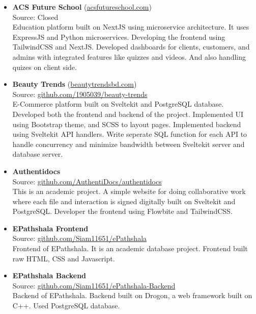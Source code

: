 
\begin{itemize}
  \item {
    \textbf{ACS Future School} (\href{https://www.acsfutureschool.com}{acsfutureschool.com}) \\
    Source: Closed \\
    Education platform built on NextJS using microservice architecture. It uses ExpressJS and Python microservices. Developing the frontend using TailwindCSS and NextJS. Developed dashboards for clients, customers, and admins with integrated features like quizzes and videos. And also handling quizes on client side.
  }
  \item {
    \textbf{Beauty Trends} (\href{https://www.beautytrendsbd.com}{beautytrendsbd.com}) \\
    Source: \href{https://github.com/1905039/beauty-trends}{github.com/1905039/beauty-trends} \\
    E-Commerce platform built on Sveltekit and PostgreSQL database. Developed both the frontend and backend of the project. Implemented UI using Bootstrap theme, and SCSS to layout pages. Implemented backend using Sveltekit API handlers. Write seperate SQL function for each API to handle concurrency and minimize bandwidth between Sveltekit server and database server.
  }
  \item {
      \textbf{Authentidocs} \\
      Source: \href{https://github.com/AuthentiDocs/authentidocs}{github.com/AuthentiDocs/authentidocs} \\
      This is an academic project. A simple website for doing collaborative work where each file and interaction is signed digitally built on Sveltekit and PostgreSQL. Developer the frontend using Flowbite and TailwindCSS.
    }
  \item {
    \textbf{EPathshala Frontend} \\
    Source: \href{https://github.com/Siam11651/ePathshala}{github.com/Siam11651/ePathshala} \\
    Frontend of EPathshala. It is an academic database project. Frontend built raw HTML, CSS and Javascript.
  }
  \item {
    \textbf{EPathshala Backend} \\
    Source: \href{https://github.com/Siam11651/ePathshala-Backend}{github.com/Siam11651/ePathshala-Backend} \\
    Backend of EPathshala. Backend built on Drogon, a web framework built on C++. Used PostgreSQL database.
}
\end{itemize}
